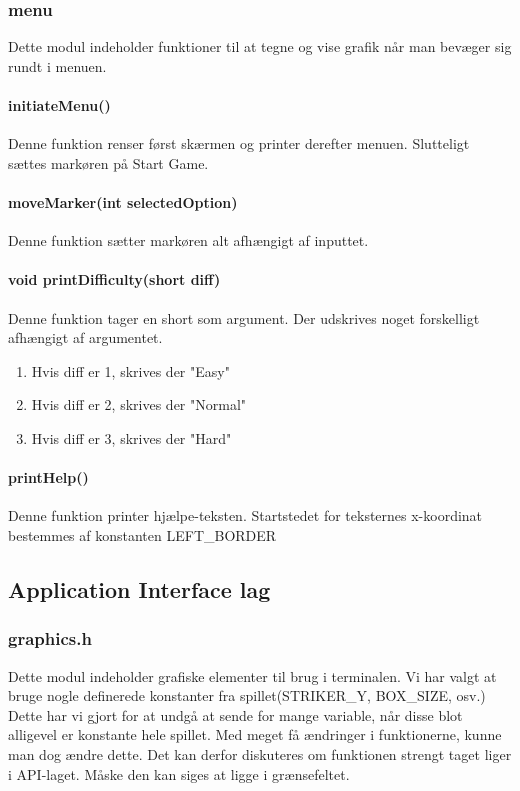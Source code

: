 \subsubsection{menu}
Dette modul indeholder funktioner til at tegne og vise grafik når man bevæger sig rundt i menuen.
\paragraph{initiateMenu()}
Denne funktion renser først skærmen og printer derefter menuen. Slutteligt sættes markøren på Start Game.
\paragraph{moveMarker(int selectedOption)}
Denne funktion sætter markøren alt afhængigt af inputtet.
\paragraph{void printDifficulty(short diff)}
Denne funktion tager en short som argument. Der udskrives noget forskelligt afhængigt af argumentet.
\begin{enumerate}
\item Hvis diff er 1, skrives der "Easy"
\item Hvis diff er 2, skrives der "Normal"
\item Hvis diff er 3, skrives der "Hard"
\end{enumerate}
\paragraph{printHelp()}
Denne funktion printer hjælpe-teksten. Startstedet for teksternes x-koordinat bestemmes af konstanten LEFT\_BORDER

\subsection{Application Interface lag}
\subsubsection{graphics.h}
Dette modul indeholder grafiske elementer til brug i terminalen. Vi har valgt at bruge nogle definerede konstanter fra spillet(STRIKER\_Y, BOX\_SIZE, osv.) Dette har vi gjort for at undgå at sende for mange variable, når disse blot alligevel er konstante hele spillet. Med meget få ændringer i funktionerne, kunne man dog ændre dette. Det kan derfor diskuteres om funktionen strengt taget liger i API-laget. Måske den kan siges at ligge i grænsefeltet.
